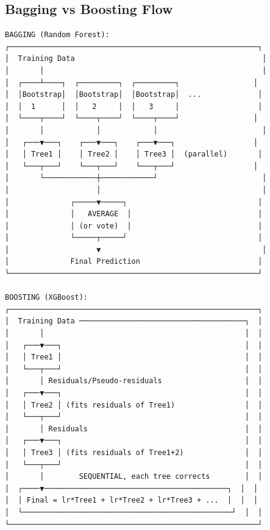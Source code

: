 \documentclass[11pt]{article}
\begin{document}
\subsection{Bagging vs Boosting Flow}\label{bagging-vs-boosting-flow}

\setcodelang{}

\begin{verbatim}
BAGGING (Random Forest):
┌─────────────────────────────────────────────────────────┐
│  Training Data                                           │
│       │                                                  │
│  ┌────┴────┐  ┌─────────┐  ┌─────────┐                 │
│  │Bootstrap│  │Bootstrap│  │Bootstrap│  ...             │
│  │  1      │  │   2     │  │   3     │                  │
│  └────┬────┘  └────┬────┘  └────┬────┘                 │
│       │            │            │                        │
│   ┌───▼───┐    ┌───▼───┐    ┌───▼───┐                  │
│   │ Tree1 │    │ Tree2 │    │ Tree3 │  (parallel)       │
│   └───┬───┘    └───┬───┘    └───┬───┘                  │
│       └────────────┼────────────┘                        │
│                    │                                     │
│              ┌─────▼─────┐                              │
│              │   AVERAGE  │                             │
│              │ (or vote)  │                             │
│              └─────┬─────┘                              │
│                    ▼                                     │
│              Final Prediction                           │
└─────────────────────────────────────────────────────────┘

BOOSTING (XGBoost):
┌─────────────────────────────────────────────────────────┐
│  Training Data ──────────────────────────────────────┐  │
│       │                                              │  │
│   ┌───▼───┐                                          │  │
│   │ Tree1 │                                          │  │
│   └───┬───┘                                          │  │
│       │ Residuals/Pseudo-residuals                   │  │
│   ┌───▼───┐                                          │  │
│   │ Tree2 │ (fits residuals of Tree1)                │  │
│   └───┬───┘                                          │  │
│       │ Residuals                                    │  │
│   ┌───▼───┐                                          │  │
│   │ Tree3 │ (fits residuals of Tree1+2)              │  │
│   └───┬───┘                                          │  │
│       │        SEQUENTIAL, each tree corrects        │  │
│  ┌────▼──────────────────────────────────────────┐  │  │
│  │ Final = lr*Tree1 + lr*Tree2 + lr*Tree3 + ...  │  │  │
│  └────────────────────────────────────────────────┘  │  │
└─────────────────────────────────────────────────────────┘
\end{verbatim}
\end{document}

